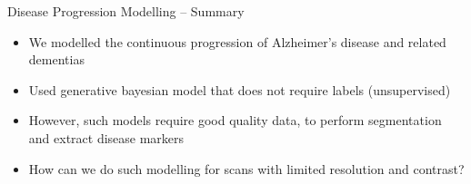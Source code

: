 \begin{frame}{Disease Progression Modelling -- Summary}

\begin{itemize}
 \item We modelled the continuous progression of Alzheimer's disease and related dementias
 
 \vo
 
 \item Used generative bayesian model that does not require labels (unsupervised)
 
 \vo
 
 \item However, such models require good quality data, to perform segmentation and extract disease markers
 
 \vo
 
 \item How can we do such modelling for scans with limited resolution and contrast?
\end{itemize}

 
\end{frame}


% 
% 
% 
% 
% 
% 


% 
% 
% 
% 
% 
% 
% 



